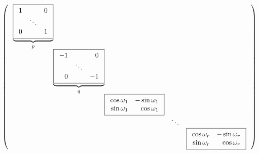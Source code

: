 \documentclass{article}
\newcommand\tikzmark[1]{%
  \tikz[overlay,remember picture,baseline] \coordinate [anchor=base] (#1);}
\newcommand\DrawBrace[3]{%
  \draw [decorate,decoration={brace,amplitude=3pt,mirror,raise=15pt}]
    (#1) -- (#2) node [black,midway,sloped,yshift=-10pt] {\footnotesize$#3$};
}
\begin{document}
\begin{preview}
\begin{equation*}
\left( \,
\begin{array}{r@{}r@{}r r r}  %
  \underbrace{
  \boxed{
    \begin{array}{rrr}              %
        1  &        & 0\\
           & \ddots &  \\
        0  &        & 1\\
    \end{array}
  }}_{p} \\
  &
  \underbrace{
  \boxed{
    \begin{array}{rrr}            %
       -1  &        & 0 \\
           & \ddots &   \\
        0  &        & -1\\
    \end{array}
  }}_{q} \\
   & & \boxed{
          \begin{array}{rr}           %
            \cos \omega_1 & -\sin \omega_1\\
            \sin \omega_1 &  \cos \omega_1\\
          \end{array}
        } \\
  & & & \ddots\\                          %
  & \tikzmark{a}& & & \boxed{
            \begin{array}{rr}       %
                \cos \omega_r & -\sin \omega_r\\
                \sin \omega_r &  \cos \omega_r\\
            \end{array}
          } \tikzmark{b} \\
\end{array}\,\right)
\end{equation*}


\end{preview}
\end{document}
